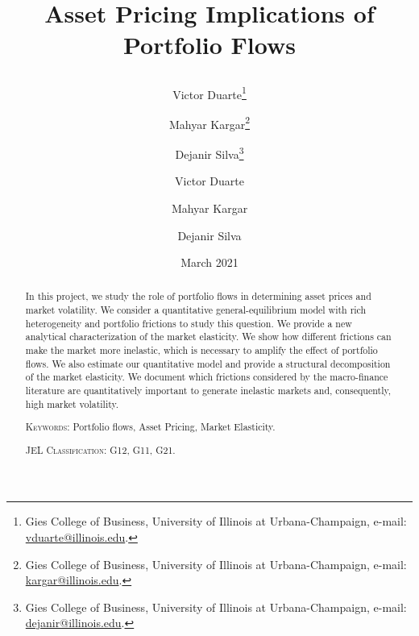 \usepackage[en-US]{datetime2}
\usepackage{mathtools}
 \usepackage{xcolor}

\newcommand{\comments}[1]
{\par {\bfseries \color{blue} #1 \par}}

\usepackage[draft]{todonotes}

\title{\textbf{Asset Pricing Implications of Portfolio Flows}
\author{ 
Victor Duarte\thanks{Gies College of Business, University of Illinois at Urbana-Champaign, e-mail: \href{mailto:vduarte@illinois.edu}{vduarte@illinois.edu}.}\and 
Mahyar Kargar\thanks{Gies College of Business, University of Illinois at Urbana-Champaign, e-mail: \href{mailto:kargar@illinois.edu}{kargar@illinois.edu}.}\and  Dejanir Silva\thanks{Gies College of Business, University of Illinois at Urbana-Champaign, e-mail: \href{dejanir@illinois.edu}{dejanir@illinois.edu}.}}
}
\author{ 
Victor Duarte
\and 
Mahyar Kargar\and 
Dejanir Silva
}
\date{March 2021}

	\sloppy
	\maketitle
	\thispagestyle{empty}
	
	\begin{abstract} 
	\noindent 
	In this project, we study the role of portfolio flows in determining asset prices and market volatility. 
	We consider a quantitative general-equilibrium model with rich heterogeneity and portfolio frictions to study this question. 
	We provide a new analytical characterization of the market  elasticity. We show  how different frictions can make the market more inelastic, which is necessary to amplify the effect of portfolio flows.
	We also estimate our quantitative model and provide a structural decomposition of the market elasticity. We document which frictions considered by the macro-finance literature are quantitatively important to generate inelastic markets and, consequently, high market volatility. 
	\vspace{10mm}	
	\bigskip
	
	\noindent	
	\textsc{Keywords}: Portfolio flows, Asset Pricing, Market Elasticity. 
	
	\medskip
	\noindent
	\textsc{JEL Classification}: G12, G11, G21.		
\end{abstract}
	
